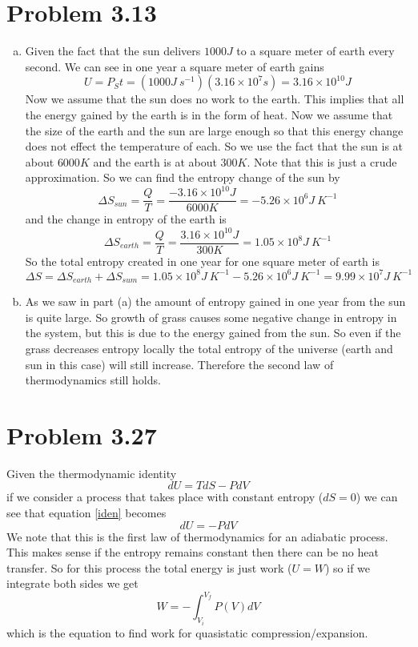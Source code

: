 \documentclass[11pt]{article}
\numberwithin{equation}{section}
\begin{document}
\section{Problem 3.13}
\begin{enumerate}[(a)]
\item
Given the fact that the sun delivers $1000\unit{J}$ to a square meter of earth every second. We can see in one year a square meter of earth gains
$$U = P_St = (1000\unit{J\ s^{-1}})(3.16\times10^{7}\unit{s}) = 3.16\times10^{10}\unit{J}$$
Now we assume that the sun does no work to the earth. This implies that all the energy gained by the earth is in the form of heat. Now we assume that the size of the earth and the sun are large enough so that this energy change does not effect the temperature of each. So we use the fact that the sun is at about $6000\unit{K}$ and the earth is at about $300\unit{K}$. Note that this is just a crude approximation. So we can find the entropy change of the sun by
$$\Delta S_{sun} = \frac{Q}{T} = \frac{-3.16\times10^{10}\unit{J}}{6000\unit{K}} = -5.26\times10^{6}\unit{J\ K^{-1}}$$
and the change in entropy of the earth is 
$$\Delta S_{earth} = \frac{Q}{T} = \frac{3.16\times10^{10}\unit{J}}{300\unit{K}} = 1.05\times10^{8}\unit{J\ K^{-1}}$$
So the total entropy created in one year for one square meter of earth is
$$\Delta S = \Delta S_{earth} + \Delta S_{sum} = 1.05\times10^{8}\unit{J\ K^{-1}} - 5.26\times10^{6}\unit{J\ K^{-1}} = 9.99\times10^{7}\unit{J\ K^{-1}}$$

\item
As we saw in part (a) the amount of entropy gained in one year from the sun is quite large. So growth of grass causes some negative change in entropy in the system, but this is due to the energy gained from the sun. So even if the grass decreases entropy locally the total entropy of the universe (earth and sun in this case) will still increase. Therefore the second law of thermodynamics still holds.
\end{enumerate}

\section{Problem 3.27}
Given the thermodynamic identity
\begin{equation}
dU = TdS - PdV
\label{iden}
\end{equation}
if we consider a process that takes place with constant entropy ($dS = 0$) we can see that equation \ref{iden} becomes
$$dU = -PdV$$
We note that this is the first law of thermodynamics for an adiabatic process. This makes sense if the entropy remains constant then there can be no heat transfer. So for this process the total energy is just work ($U=W$) so if we integrate both sides we get
$$W = -\int_{V_i}^{V_f}P(V)dV$$
which is the equation to find work for quasistatic compression/expansion.
\end{document}
